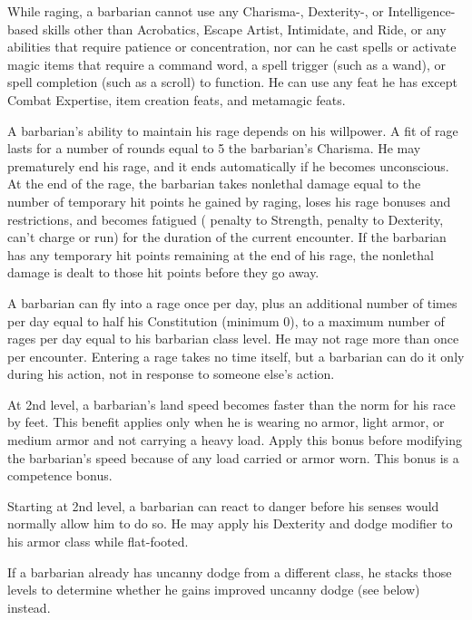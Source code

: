 While raging, a barbarian cannot use any Charisma-, Dexterity-, or Intelligence-based skills other than Acrobatics, Escape Artist, Intimidate, and Ride, or any abilities that require patience or concentration, nor can he cast spells or activate magic items that require a command word, a spell trigger (such as a wand), or spell completion (such as a scroll) to function. He can use any feat he has except Combat Expertise, item creation feats, and metamagic feats.

\par A barbarian's ability to maintain his rage depends on his willpower. A fit of rage lasts for a number of rounds equal to 5 \add the barbarian's Charisma. He may prematurely end his rage, and it ends automatically if he becomes unconscious. At the end of the rage, the barbarian takes nonlethal damage equal to the number of temporary hit points he gained by raging, loses his rage bonuses and restrictions, and becomes fatigued ( penalty to Strength,  penalty to Dexterity, can't charge or run) for the duration of the current encounter.  If the barbarian has any temporary hit points remaining at the end of his rage, the nonlethal damage is dealt to those hit points before they go away.

\par A barbarian can fly into a rage once per day, plus an additional number of times per day equal to half his Constitution (minimum 0), to a maximum number of rages per day equal to his barbarian class level. He may not rage more than once per encounter. Entering a rage takes no time itself, but a barbarian can do it only during his action, not in response to someone else's action.

 At 2nd level, a barbarian's land speed becomes faster than the norm for his race by  feet. This benefit applies only when he is wearing no armor, light armor, or medium  armor and not carrying a heavy load. Apply this bonus before modifying the barbarian's speed because of any load carried or armor worn. This bonus is a competence bonus.

 Starting at 2nd level, a barbarian can react to danger before his senses would normally allow him to do so. He may apply his Dexterity and dodge modifier to his armor class while flat-footed.

If a barbarian already has uncanny dodge from a different class, he stacks those levels to determine whether he gains improved uncanny dodge (see below) instead.

